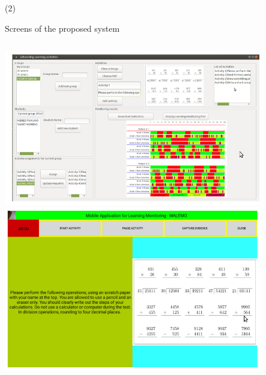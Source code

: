 \begin{frame}{ (2)}
\begin{block}{Screens of the proposed system}
\begin{columns}
    \begin{column}{0.4\textwidth}  
        \begin{center}
     \includegraphics[width=0.85\textwidth]{Figs/LearningMonitoring1}
     \includegraphics[width=0.85\textwidth]{Figs/LearningMonitoring2}
     \end{center}
    \end{column}
        \end{columns}
     
\end{block} 
\end{frame}



